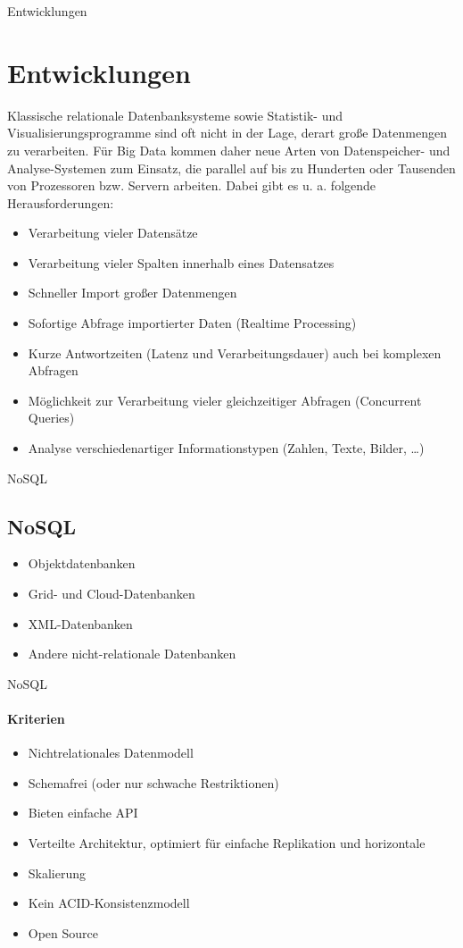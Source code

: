 \documentclass[11pt]{beamer}
\begin{document}
\begin{frame}{Entwicklungen}
\section{Entwicklungen}
Klassische relationale Datenbanksysteme sowie Statistik- und Visualisierungsprogramme sind oft nicht in der Lage, derart große Datenmengen zu verarbeiten. Für Big Data kommen daher neue Arten von Datenspeicher- und Analyse-Systemen zum Einsatz, die parallel auf bis zu Hunderten oder Tausenden von Prozessoren bzw. Servern arbeiten. Dabei gibt es u. a. folgende Herausforderungen:
\end{frame}
\begin{frame}
\begin{itemize}
\item Verarbeitung vieler Datensätze
\item Verarbeitung vieler Spalten innerhalb eines Datensatzes
\item Schneller Import großer Datenmengen
\item Sofortige Abfrage importierter Daten (Realtime Processing)
\item Kurze Antwortzeiten (Latenz und Verarbeitungsdauer) auch bei komplexen Abfragen
\item Möglichkeit zur Verarbeitung vieler gleichzeitiger Abfragen (Concurrent Queries)
\item Analyse verschiedenartiger Informationstypen (Zahlen, Texte, Bilder, …)

\end{itemize}

\end{frame}

\begin{frame}{NoSQL}
\subsection{NoSQL}
\begin{itemize}
\item Objektdatenbanken
\item Grid- und Cloud-Datenbanken
\item XML-Datenbanken
\item Andere nicht-relationale Datenbanken
\end{itemize}
\end{frame}

\begin{frame}{NoSQL}
\framesubtitle{Kriterien}
\begin{itemize}
\item Nichtrelationales Datenmodell
\item Schemafrei (oder nur schwache Restriktionen)
\item Bieten einfache API
\item Verteilte Architektur, optimiert für einfache Replikation und horizontale \item Skalierung
\item Kein ACID-Konsistenzmodell
\item Open Source
\end{itemize}
\end{frame}
\end{document}
